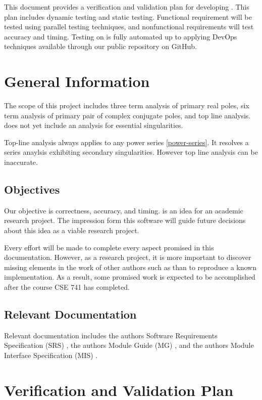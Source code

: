 \documentclass[12pt, titlepage]{article}
\begin{document}
This document provides a verification and validation plan for developing .
This plan includes dynamic testing and static testing. Functional requirement will be tested
using parallel testing techniques, and nonfunctional requirements will test accuracy and timing.
Testing on  is fully automated up to applying DevOps techniques available through
our public repository on GitHub.

\section{General Information}

The scope of this  project includes three term analysis of primary real poles,
six term analysis of primary pair of complex conjugate poles, and top line analysis.
 does not yet include an analysis for essential singularities.

Top-line analysis always applies to any power series \eqref{power-series}. It resolves
a series anaylsis exhibiting secondary singularities. However top line analysis can be
inaccurate.

\subsection{Objectives}

Our objective is correctness, accuracy, and timing.  is an idea for an academic
research project. The impression form this software will guide future decisions about
this idea as a viable research project.

Every effort will be made to complete every aspect
promised in this documentation. However, as a research project, it is more important to
discover missing elements in the work of other authors such as \cite{chang1982} than
to reproduce a known implementation. As a result, some promised work is expected to be
accomplished after the course CSE 741 has completed.

\subsection{Relevant Documentation}

Relevant documentation includes the authors Software Requirements Specification (SRS) \citep{SRS}, the
authors Module Guide (MG) \citep{MG}, and the authors Module Interface Specification (MIS) \citep{MIS}.

\section{Verification and Validation Plan}
\end{document}
